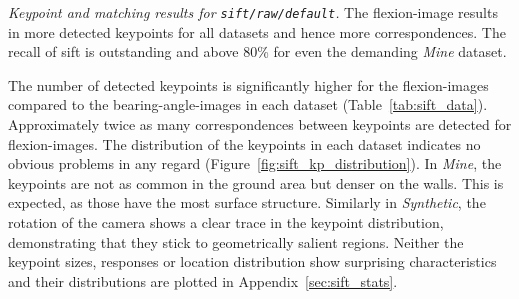 \begin{table}[b!]
    {\renewcommand{\arraystretch}{1.2}%
    \setlength{\tabcolsep}{0.7em}%
    \footnotesize

    }
    \caption[Keypoint and matching results for \texttt{\acrshort{sift}/raw/default}]{\emph{Keypoint and matching results for \texttt{\acrshort{sift}/raw/default}.} The \gls{flexion-image} results in more detected keypoints for all datasets and hence more correspondences. The recall of \acrshort{sift} is outstanding and above 80\% for even the demanding \emph{Mine} dataset.}\label{tab:sift_data}
\end{table}
The number of detected keypoints is significantly higher for the \glspl{flexion-image} compared to the \glspl{bearing-angle-image} in each dataset (Table~\ref{tab:sift_data}).
Approximately twice as many correspondences between keypoints are detected for \glspl{flexion-image}.
The distribution of the keypoints in each dataset indicates no obvious problems in any regard (Figure~\ref{fig:sift_kp_distribution}).
In \emph{Mine}, the keypoints are not as common in the ground area but denser on the walls.
This is expected, as those have the most surface structure.
Similarly in \emph{Synthetic}, the rotation of the camera shows a clear trace in the keypoint distribution, demonstrating that they stick to geometrically salient regions.
Neither the keypoint sizes, responses or location distribution show surprising characteristics and their distributions are plotted in Appendix~\ref{sec:sift_stats}.

